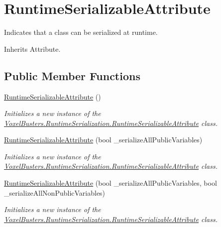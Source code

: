 \hypertarget{class_voxel_busters_1_1_runtime_serialization_1_1_runtime_serializable_attribute}{}\section{Runtime\+Serializable\+Attribute}
\label{class_voxel_busters_1_1_runtime_serialization_1_1_runtime_serializable_attribute}


Indicates that a class can be serialized at runtime.  




Inherits Attribute.

\subsection*{Public Member Functions}
\begin{DoxyCompactItemize}
\item 
\hyperlink{class_voxel_busters_1_1_runtime_serialization_1_1_runtime_serializable_attribute_aa3cb2cc3689fb86c9017b0a719be2752}{Runtime\+Serializable\+Attribute} ()
\begin{DoxyCompactList}\small\item\em Initializes a new instance of the \hyperlink{class_voxel_busters_1_1_runtime_serialization_1_1_runtime_serializable_attribute}{Voxel\+Busters.\+Runtime\+Serialization.\+Runtime\+Serializable\+Attribute} class. \end{DoxyCompactList}\item 
\hyperlink{class_voxel_busters_1_1_runtime_serialization_1_1_runtime_serializable_attribute_aad88c45dd08a7aa5fe22b8be15ed6c89}{Runtime\+Serializable\+Attribute} (bool \+\_\+serialize\+All\+Public\+Variables)
\begin{DoxyCompactList}\small\item\em Initializes a new instance of the \hyperlink{class_voxel_busters_1_1_runtime_serialization_1_1_runtime_serializable_attribute}{Voxel\+Busters.\+Runtime\+Serialization.\+Runtime\+Serializable\+Attribute} class. \end{DoxyCompactList}\item 
\hyperlink{class_voxel_busters_1_1_runtime_serialization_1_1_runtime_serializable_attribute_a2905def45da7c64fc82be1b7d8a06953}{Runtime\+Serializable\+Attribute} (bool \+\_\+serialize\+All\+Public\+Variables, bool \+\_\+serialize\+All\+Non\+Public\+Variables)
\begin{DoxyCompactList}\small\item\em Initializes a new instance of the \hyperlink{class_voxel_busters_1_1_runtime_serialization_1_1_runtime_serializable_attribute}{Voxel\+Busters.\+Runtime\+Serialization.\+Runtime\+Serializable\+Attribute} class. \end{DoxyCompactList}\end{DoxyCompactItemize}


